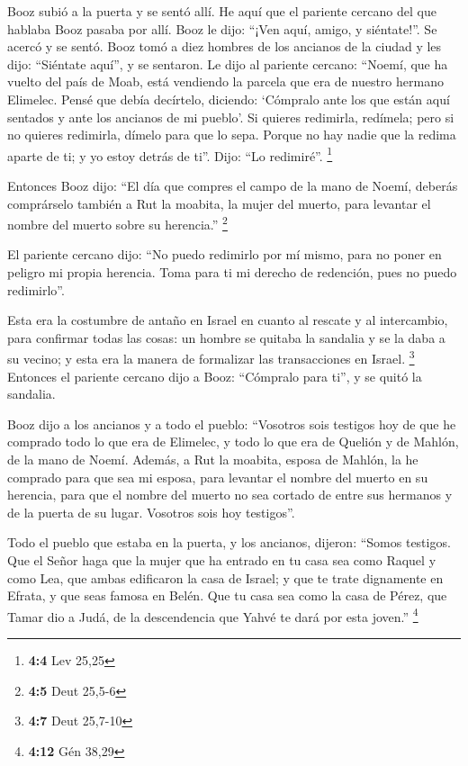  Booz subió a la puerta y se sentó allí. He aquí que el
pariente cercano del que hablaba Booz pasaba por allí. Booz le dijo:
``¡Ven aquí, amigo, y siéntate!''. Se acercó y se sentó. 
Booz tomó a diez hombres de los ancianos de la ciudad y les dijo:
``Siéntate aquí'', y se sentaron.  Le dijo al pariente
cercano: ``Noemí, que ha vuelto del país de Moab, está vendiendo la
parcela que era de nuestro hermano Elimelec.  Pensé que
debía decírtelo, diciendo: `Cómpralo ante los que están aquí sentados y
ante los ancianos de mi pueblo'. Si quieres redimirla, redímela; pero si
no quieres redimirla, dímelo para que lo sepa. Porque no hay nadie que
la redima aparte de ti; y yo estoy detrás de ti''. Dijo: ``Lo
redimiré''. \footnote{\textbf{4:4} Lev 25,25}

 Entonces Booz dijo: ``El día que compres el campo de la
mano de Noemí, deberás comprárselo también a Rut la moabita, la mujer
del muerto, para levantar el nombre del muerto sobre su herencia.''
\footnote{\textbf{4:5} Deut 25,5-6}

 El pariente cercano dijo: ``No puedo redimirlo por mí
mismo, para no poner en peligro mi propia herencia. Toma para ti mi
derecho de redención, pues no puedo redimirlo''.

 Esta era la costumbre de antaño en Israel en cuanto al
rescate y al intercambio, para confirmar todas las cosas: un hombre se
quitaba la sandalia y se la daba a su vecino; y esta era la manera de
formalizar las transacciones en Israel. \footnote{\textbf{4:7} Deut
  25,7-10}  Entonces el pariente cercano dijo a Booz:
``Cómpralo para ti'', y se quitó la sandalia.

 Booz dijo a los ancianos y a todo el pueblo: ``Vosotros
sois testigos hoy de que he comprado todo lo que era de Elimelec, y todo
lo que era de Quelión y de Mahlón, de la mano de Noemí. 
Además, a Rut la moabita, esposa de Mahlón, la he comprado para que sea
mi esposa, para levantar el nombre del muerto en su herencia, para que
el nombre del muerto no sea cortado de entre sus hermanos y de la puerta
de su lugar. Vosotros sois hoy testigos''.

 Todo el pueblo que estaba en la puerta, y los ancianos,
dijeron: ``Somos testigos. Que el Señor haga que la mujer que ha entrado
en tu casa sea como Raquel y como Lea, que ambas edificaron la casa de
Israel; y que te trate dignamente en Efrata, y que seas famosa en Belén.
 Que tu casa sea como la casa de Pérez, que Tamar dio a
Judá, de la descendencia que Yahvé te dará por esta joven.'' \footnote{\textbf{4:12}
  Gén 38,29}

